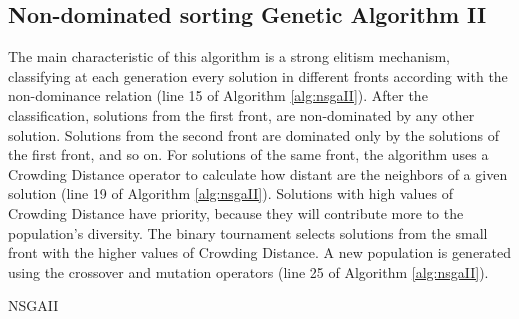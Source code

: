\subsection{Non-dominated sorting Genetic Algorithm II}


The main characteristic of this algorithm is a strong elitism mechanism, classifying at each generation every solution in different fronts according with the non-dominance relation (line 15 of Algorithm \ref{alg:nsgaII}). After the classification, solutions from the first front, are non-dominated by any other solution. Solutions from the second front are dominated only by the solutions of the first front, and so on. For solutions of the same front, the algorithm uses a Crowding Distance operator to calculate how distant are the neighbors of a given solution (line 19 of Algorithm \ref{alg:nsgaII}). Solutions with high values of Crowding Distance have priority, because they will contribute more to the population's diversity. The binary tournament selects solutions from the small front with the higher values of Crowding Distance. A new population is generated using the crossover and mutation operators (line 25 of Algorithm \ref{alg:nsgaII}).


\begin{algorithm}[h]
	\begin{algorithmic}[1]
		\EndWhile
			\EndWhile
			
		\EndWhile
	\end{algorithmic}
	\caption{NSGAII}
	\label{alg:nsgaII}
\end{algorithm}


